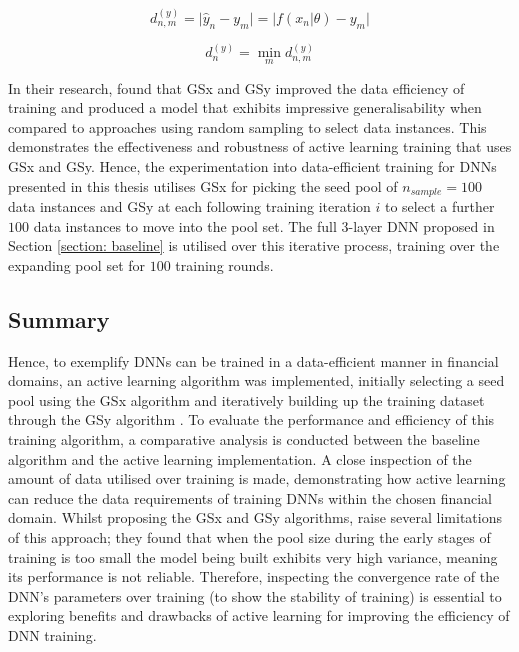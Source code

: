 \documentclass[a4paper, 11pt]{report}
\begin{document}
    \begin{equation}
        \label{eq: GSy-distance}
        d^{(y)}_{n, m} = \lvert \hat{y}_n - y_m \lvert = \lvert f( x_n \vert \theta ) - y_m \lvert
    \end{equation}
  
    \begin{equation}
        \label{eq: GSy-min}
        d^{(y)}_n = \min_m d^{(y)}_{n, m}
    \end{equation}


    In their research, \citet{wu-2019} found that GSx and GSy improved the data efficiency of training and produced a model that exhibits impressive generalisability when compared to approaches using random sampling to select data instances. This demonstrates the effectiveness and robustness of active learning training that uses GSx and GSy. Hence, the experimentation into data-efficient training for DNNs presented in this thesis utilises GSx for picking the seed pool of $n_{sample} = 100$ data instances and GSy at each following training iteration $i$ to select a further $100$ data instances to move into the pool set. The full $3$-layer DNN proposed in Section \ref{section: baseline} is utilised over this iterative process, training over the expanding pool set for $100$ training rounds.


    \subsection{Summary}

    Hence, to exemplify DNNs can be trained in a data-efficient manner in financial domains, an active learning algorithm was implemented, initially selecting a seed pool using the GSx algorithm and iteratively building up the training dataset through the GSy algorithm \citep{wu-2019}. To evaluate the performance and efficiency of this training algorithm, a comparative analysis is conducted between the baseline algorithm and the active learning implementation. A close inspection of the amount of data utilised over training is made, demonstrating how active learning can reduce the data requirements of training DNNs within the chosen financial domain. Whilst proposing the GSx and GSy algorithms, \citet{wu-2019} raise several limitations of this approach; they found that when the pool size during the early stages of training is too small the model being built exhibits very high variance, meaning its performance is not reliable. Therefore, inspecting the convergence rate of the DNN's parameters over training (to show the stability of training) is essential to exploring benefits and drawbacks of active learning for improving the efficiency of DNN training.
\end{document}
